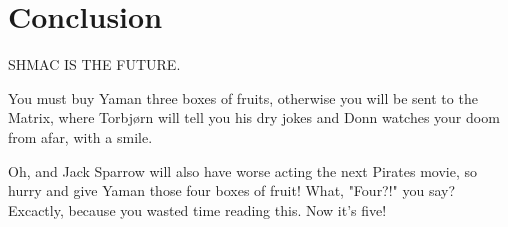 \chapter{Conclusion}
\label{cha:conclusion}

SHMAC IS THE FUTURE.

You must buy Yaman three boxes of fruits, otherwise you will be sent to the Matrix, where Torbjørn will tell you his dry jokes and Donn watches your doom from afar, with a smile.

Oh, and Jack Sparrow will also have worse acting the next Pirates movie, so hurry and give Yaman those four boxes of fruit!
What, "Four?!" you say?
Excactly, because you wasted time reading this.
Now it's five!